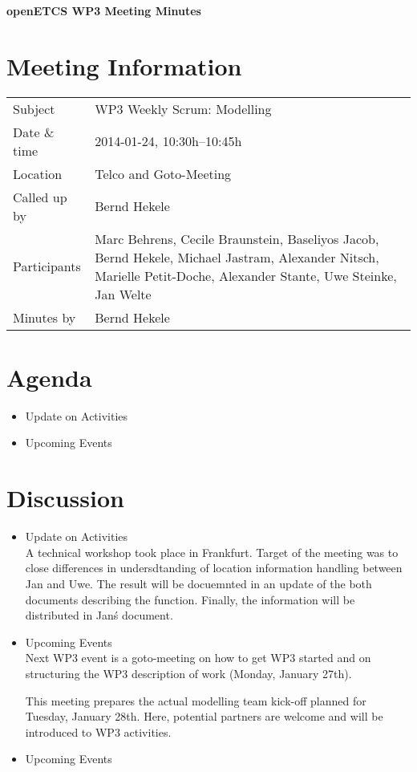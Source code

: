 \documentclass[a4paper, 11pt]{article}
\begin{document}
{\begin{center}\huge\bf openETCS WP3 Meeting Minutes\end{center}}
\section{Meeting Information}

\renewcommand{\arraystretch}{1.5}
\begin{supertabular}{m{.2\textwidth}m{.8\textwidth}}
Subject & WP3 Weekly Scrum: Modelling\\
Date \& time & 2014-01-24, 10:30h--10:45h\\
Location & Telco and Goto-Meeting\\
Called up by & Bernd Hekele\\
Participants &
Marc Behrens,
Cecile Braunstein,
Baseliyos Jacob,
Bernd Hekele,
Michael Jastram,
Alexander Nitsch,
Marielle Petit-Doche,
Alexander Stante,
Uwe Steinke,
Jan Welte
\\

Minutes by & Bernd Hekele\\
\end{supertabular}
\renewcommand{\arraystretch}{1.0}


\section{{Agenda}}
\begin{itemize}
\item Update on Activities
\item Upcoming Events
\end{itemize}

\section{Discussion}
\begin{itemize}
\item Update on Activities\\
A technical workshop took place in Frankfurt. Target of the meeting was to close differences in undersdtanding of location information handling between Jan  and Uwe. The result will be docuemnted in an update of the both documents describing the function. Finally, the information will be distributed in Jan\'s document. 

\item Upcoming Events\\
Next WP3 event is a goto-meeting on how to get WP3 started and on structuring the WP3 description of work (Monday, January 27th).

This meeting prepares the actual modelling team kick-off planned for Tuesday, January 28th. Here, potential partners are welcome and will be introduced to WP3 activities.


\item Upcoming Events 
\end{itemize}
\end{document}
